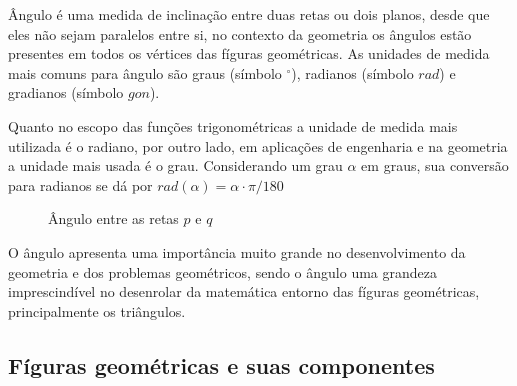 \begin{multicols*}{2}
    Ângulo é uma medida de inclinação entre duas retas ou dois planos, desde que eles não sejam paralelos entre si, no
    contexto da geometria os ângulos estão presentes em todos os vértices das fíguras geométricas.
    As unidades de medida mais comuns para ângulo são graus (símbolo $^{\circ}$), radianos (símbolo $rad$) e gradianos (símbolo $gon$).

    Quanto no escopo das funções trigonométricas a unidade de medida mais utilizada é o radiano, por outro lado,
    em aplicações de engenharia e na geometria a unidade mais usada é o grau. Considerando um grau $\alpha$ em graus,
    sua conversão para radianos se dá por $rad(\alpha) = \alpha\cdot\pi/180$

    \begin{figure}[H]
        \centering
        \caption{Ângulo entre as retas $p$ e $q$}
    \end{figure}

    O ângulo apresenta uma importância muito grande no desenvolvimento da geometria e dos problemas geométricos, sendo o
    ângulo uma grandeza imprescindível no desenrolar da matemática entorno das fíguras geométricas, principalmente os
    triângulos.

    \subsection{Fíguras geométricas e suas componentes}


\end{multicols*}
